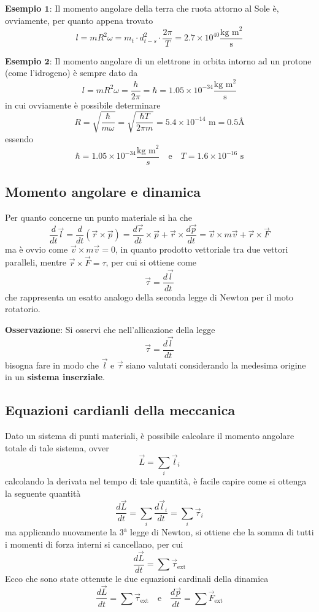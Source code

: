 \documentclass[a4paper]{extarticle}
\begin{document}
\vspace{1em}
\noindent
\textbf{Esempio $\boldsymbol{1}$}: Il momento angolare della terra che ruota attorno al Sole è, ovviamente, per quanto appena trovato
\[l=mR^2 \omega = m_t \cdot d_{t-s}^2 \cdot \frac{2\pi}{T} = 2.7 \times 10^{40} \frac{\text{kg m}^2}{\text{s}}\]

\vspace{1em}
\noindent
\textbf{Esempio $\boldsymbol{2}$}: Il momento angolare di un elettrone in orbita intorno ad un protone (come l'idrogeno) è sempre dato da
\[l=m R^2 \omega=\frac{h}{2\pi}=\hbar= 1.05 \times 10^{-34} \frac{\text{kg m}^2}{\text{s}}\]
in cui ovviamente è possibile determinare
\[R=\sqrt{\frac{\hbar}{m \omega}}=\sqrt{\frac{\hbar T}{2\pi m}}=5.4 \times 10^{-14} \text{ m} = 0.5 \text{\AA}\]
essendo
\[\hbar = 1.05 \times 10^{-34} \frac{\text{kg m}^2}{s} \hspace{1em} \text{e} \hspace{1em} T=1.6 \times 10^{-16} \text{ s}\]

\vspace{1em}
\subsection{Momento angolare e dinamica}
Per quanto concerne un punto materiale si ha che
\[\frac{d}{dt} \vec l = \frac{d}{dt}(\vec r \times \vec p) = \frac{d \vec r}{dt} \times \vec p + \vec r \times \frac{d \vec p}{dt} = \vec v \times m \vec v + \vec r \times \vec F\]
ma è ovvio come $\vec v \times m \vec v = 0$, in quanto prodotto vettoriale tra due vettori paralleli, mentre $\vec r \times \vec F = \tau$, per cui si ottiene come
\[\boxed{\vec \tau = \frac{d \vec l}{dt}}\]
che rappresenta un esatto analogo della seconda legge di Newton per il moto rotatorio.

\vspace{1em}
\noindent
\textbf{Osservazione}: Si osservi che nell'allicazione della legge
\[\vec \tau = \frac{d \vec l}{dt}\]
bisogna fare in modo che $\vec l$ e $\vec \tau$ siano valutati considerando la medesima origine in un \textbf{sistema inserziale}.

\vspace{1em}
\subsection{Equazioni cardianli della meccanica}
Dato un sistema di punti materiali, è possibile calcolare il momento angolare totale di tale sistema, ovver
\[\vec L = \sum_i \vec l_i\]
calcolando la derivata nel tempo di tale quantità, è facile capire come si ottenga la seguente quantità
\[\frac{d \vec L}{dt} = \sum_i \frac{d\vec l_i}{dt} = \sum_i \vec \tau_i\]
ma applicando nuovamente la $3^\text{a}$ legge di Newton, si ottiene che la somma di tutti i momenti di forza interni si cancellano, per cui
\[\frac{d \vec L}{dt} = \sum \vec \tau_{\text{ext}}\]
Ecco che sono state ottenute le due equazioni cardinali della dinamica
\[\boxed{\frac{d \vec L}{dt} = \sum \vec \tau_{\text{ext}}} \hspace{1em} \text{e} \hspace{1em} \boxed{\frac{d \vec p}{dt} = \sum \vec F_{\text{ext}}}\]
\end{document}
